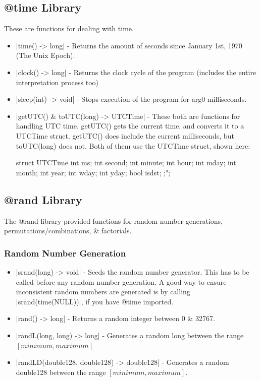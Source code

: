 \documentclass[12pt, letterpaper, oneside]{article}
\begin{document}
	\subsection{@time Library}
	These are functions for dealing with time.
	\begin{itemize}
		\item[--] \spverb|time() -> long| - Returns the amount of seconds since January 1st, 1970 (The Unix Epoch).
		\item[--] \spverb|clock() -> long| - Returns the clock cycle of the program (includes the entire interpretation process too)
		\item[--] \spverb|sleep(int) -> void| - Stops execution of the program for arg0 milliseconds.
		\item[--] \spverb|getUTC() & toUTC(long) -> UTCTime| - These both are functions for handling UTC time. getUTC() gets the current time, and converts it to a UTCTime struct. getUTC() does include the current milliseconds, but toUTC(long) does not. Both of them use the UTCTime struct, shown here:
		
		
		\begin{spverbatim}
			struct UTCTime {
				int ms;
				int second;
				int minute;
				int hour;
				int mday;
				int month;
				int year;
				int wday;
				int yday;
				bool isdst;
			};";
		\end{spverbatim}
	\end{itemize}
	\subsection{@rand Library}
	The @rand library provided functions for random number generations, permutations/combinations, \& factorials.
	\subsubsection{Random Number Generation}
		\begin{itemize}
			\item[--] \spverb|srand(long) -> void| - Seeds the random number generator. This has to be called before any random number generation. A good way to ensure inconsistent random numbers are generated is by calling \spverb|srand(time(NULL))|, if you have @time imported.
			\item[--] \spverb|rand() -> long| - Returns a random integer between 0 \& 32767.
			\item[--] \spverb|randL(long, long) -> long| - Generates a random long between the range $[minimum, maximum]$
			\item[--] \spverb|randLD(double128, double128) -> double128| - Generates a random double128 between the range $[minimum, maximum]$.
		\end{itemize}
\end{document}
